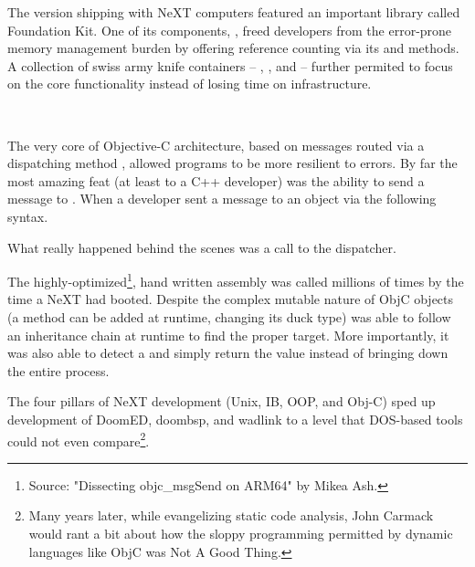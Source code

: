 \par
\vspace{-5pt}
The version shipping with NeXT computers featured an important library called Foundation Kit. One of its components, , freed developers from the error-prone memory management burden by offering reference counting via its  and  methods. A collection of swiss army knife containers -- , ,  and  -- further permited to focus on the core functionality instead of losing time on infrastructure.\\
\par
{}\\
\par
The very core of Objective-C architecture, based on messages routed via a dispatching method , allowed programs to be more resilient to errors. By far the most amazing feat (at least to a C++ developer) was the ability to send a message to . When a developer sent a message to an object via the following syntax.\\ \par
{}
What really happened behind the scenes was a call to the dispatcher.\\
\par
{}
The highly-optimized\footnote{Source: "Dissecting objc\_msgSend on ARM64" by Mikea Ash.}, hand written assembly was called millions of times by the time a NeXT had booted. Despite the complex mutable nature of ObjC objects (a method can be added at runtime, changing its duck type)  was able to follow an inheritance chain at runtime to find the proper target. More importantly, it was also able to detect a  and simply return the value  instead of bringing down the entire process.\\
\par

The four pillars of NeXT development (Unix, IB, OOP, and Obj-C) sped up development of DoomED, doombsp, and wadlink to a level that DOS-based tools could not even compare\footnote{Many years later, while evangelizing static code analysis, John Carmack would rant a bit about how the sloppy programming permitted by dynamic languages like ObjC was Not A Good Thing.}.

